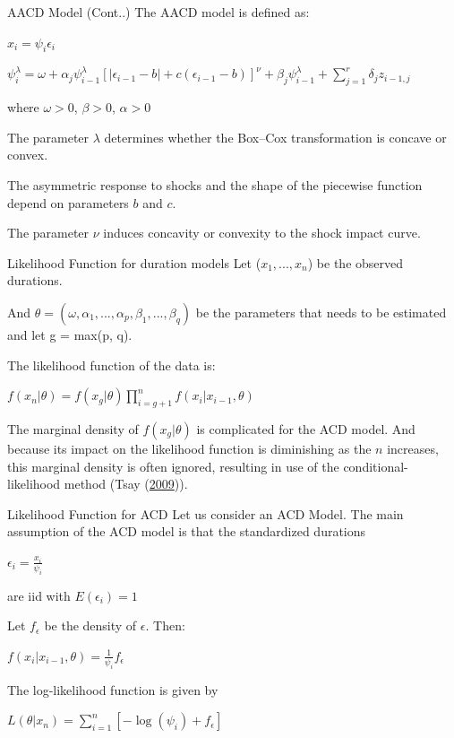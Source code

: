 \documentclass[
  ignorenonframetext,
]{beamer}
\begin{document}
\begin{frame}{AACD Model (Cont..)}
\protect\hypertarget{aacd-model-cont..}{}
The AACD model is defined as:

\(x_i=\psi_i\epsilon_i\)

\(\psi_i^{\lambda}=\omega+\alpha_j\psi_{i-1}^{\lambda}[|\epsilon_{i-1}-b|+c(\epsilon_{i-1}-b)]^{\nu}+\beta_j\psi_{i-1}^{\lambda}+\sum_{j=1}^r\delta_jz_{i-1,j}\)

where \(\omega > 0\), \(\beta > 0\), \(\alpha > 0\)

The parameter \(\lambda\) determines whether the Box--Cox transformation
is concave or convex.

The asymmetric response to shocks and the shape of the piecewise
function depend on parameters \(b\) and \(c\).

The parameter \(\nu\) induces concavity or convexity to the shock impact
curve.
\end{frame}

\begin{frame}{Likelihood Function for duration models}
\protect\hypertarget{likelihood-function-for-duration-models}{}
Let (\(x_1,...,x_n\)) be the observed durations.

And \(\theta=(\omega, \alpha_1, ..., \alpha_p, \beta_1,..., \beta_q)\)
be the parameters that needs to be estimated and let g = max(p, q).

The likelihood function of the data is:

\(f(x_n|\theta)=f(x_g|\theta)\prod_{i=g+1}^nf(x_i|x_{i-1},\theta)\)

The marginal density of \(f(x_g|\theta)\) is complicated for the ACD
model. And because its impact on the likelihood function is diminishing
as the \(n\) increases, this marginal density is often ignored,
resulting in use of the conditional-likelihood method (Tsay
(\protect\hyperlink{ref-ACDtext}{2009})).
\end{frame}

\begin{frame}{Likelihood Function for ACD}
\protect\hypertarget{likelihood-function-for-acd}{}
Let us consider an ACD Model. The main assumption of the ACD model is
that the standardized durations

\(\epsilon_i=\frac{x_i}{\psi_i}\)

are iid with \(E(\epsilon_i)=1\)

Let \(f_{\epsilon}\) be the density of \(\epsilon\). Then:

\(f(x_i|x_{i-1},\theta)=\frac{1}{\psi_i}f_{\epsilon}\)

The log-likelihood function is given by

\(L(\theta|x_n)=\sum_{i=1}^n[-\log(\psi_i)+f_{\epsilon}]\)\\
\end{frame}
\end{document}
